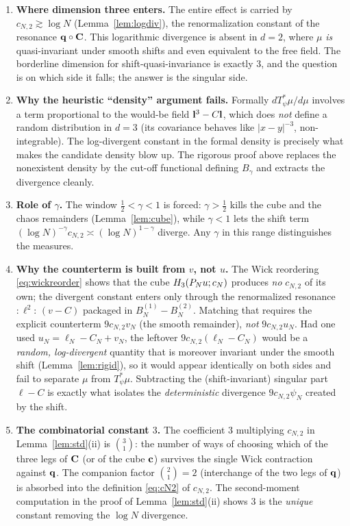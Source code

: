 \begin{enumerate}\setlength\itemsep{4pt}
\item \textbf{Where dimension three enters.} The entire effect is carried by
$c_{N,2}\gtrsim\log N$ (Lemma~\ref{lem:logdiv}), the renormalization constant of
the resonance $\mathbf{q}\circ\mathbf{C}$. This logarithmic
divergence is absent in $d=2$, where $\mu$ \emph{is} quasi-invariant under smooth
shifts and even equivalent to the free field. The borderline dimension for
shift-quasi-invariance is exactly $3$, and the question is on which side it falls;
the answer is the singular side.

\item \textbf{Why the heuristic ``density'' argument fails.} Formally
$dT_\psi^*\mu/d\mu$ involves a term proportional to the would-be field
$\mathbf{l}^3-C\mathbf{l}$, which does \emph{not} define a random distribution in $d=3$ (its
covariance behaves like $|x-y|^{-3}$, non-integrable). The log-divergent constant
in the formal density is precisely what makes the candidate density blow up. The
rigorous proof above replaces the nonexistent density by the cut-off functional
defining $B_\gamma$ and extracts the divergence cleanly.

\item \textbf{Role of $\gamma$.} The window $\tfrac12<\gamma<1$ is forced:
$\gamma>\tfrac12$ kills the cube and the chaos remainders (Lemma~\ref{lem:cube}),
while $\gamma<1$ lets the shift term $(\log N)^{-\gamma}c_{N,2}\asymp(\log
N)^{1-\gamma}$ diverge. Any $\gamma$ in this range distinguishes the measures.

\item \textbf{Why the counterterm is built from $v$, not $u$.} The Wick
reordering \eqref{eq:wickreorder} shows that the cube
$H_3(P_N u;c_N)$ produces \emph{no} $c_{N,2}$ of its own; the divergent
constant enters only through the renormalized resonance
${:}\ell^2{:}\,(v-C)$ packaged in $B^{(1)}_N-B^{(2)}_N$. Matching that requires the
explicit counterterm $9c_{N,2}v_N$ (the smooth remainder), \emph{not}
$9c_{N,2}u_N$. Had one used $u_N=\ell_N-C_N+v_N$, the leftover
$9c_{N,2}(\ell_N-C_N)$ would be a \emph{random, log-divergent} quantity that is
moreover invariant under the smooth shift (Lemma~\ref{lem:rigid}), so it would
appear identically on both sides and fail to separate $\mu$ from $T_\psi^*\mu$.
Subtracting the (shift-invariant) singular part $\ell-C$ is exactly what isolates
the \emph{deterministic} divergence $9c_{N,2}\psi_N$ created by the shift.

\item \textbf{The combinatorial constant $3$.} The coefficient $3$ multiplying
$c_{N,2}$ in Lemma~\ref{lem:std}(ii) is $\binom{3}{1}$: the number of ways of
choosing which of the three legs of $\mathbf{C}$ (or of the cube $\mathbf{c}$) survives the
single Wick contraction against $\mathbf{q}$. The companion factor
$\binom{2}{1}=2$ (interchange of the two legs of $\mathbf{q}$) is absorbed into the
definition \eqref{eq:cN2} of $c_{N,2}$. The second-moment computation in the proof
of Lemma~\ref{lem:std}(ii) shows $3$ is the \emph{unique} constant removing the
$\log N$ divergence.
\end{enumerate}

